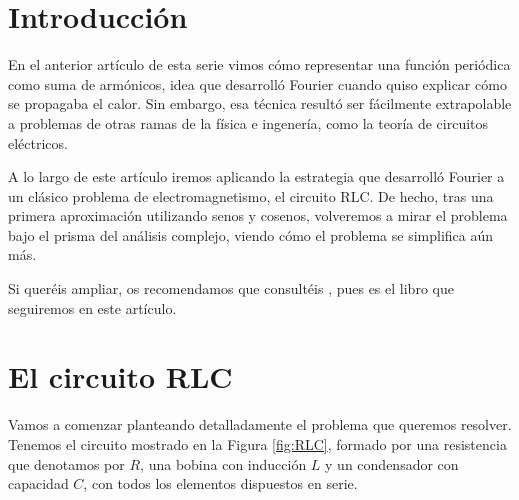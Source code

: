 \section{Introducción}
En el anterior artículo de esta serie vimos cómo representar una función periódica como suma de armónicos, idea que desarrolló Fourier cuando quiso explicar cómo se propagaba el calor. Sin embargo, esa técnica resultó ser fácilmente extrapolable a problemas de otras ramas de la física e ingenería, como la teoría de circuitos eléctricos.

A lo largo de este artículo iremos aplicando la estrategia que desarrolló Fourier a un clásico problema de electromagnetismo, el circuito RLC. De hecho, tras una primera aproximación utilizando senos y cosenos, volveremos a mirar el problema bajo el prisma del análisis complejo, viendo cómo el problema se simplifica aún más.

Si queréis ampliar, os recomendamos que consultéis \cite{Sadiku}, pues es el libro que seguiremos en este artículo.


\section{El circuito RLC}
Vamos a comenzar planteando detalladamente el problema que queremos resolver. Tenemos el circuito mostrado en la Figura \ref{fig:RLC}, formado por una resistencia que denotamos por $R$, una bobina con inducción $L$ y un condensador con capacidad $C$, con todos los elementos dispuestos en serie.


